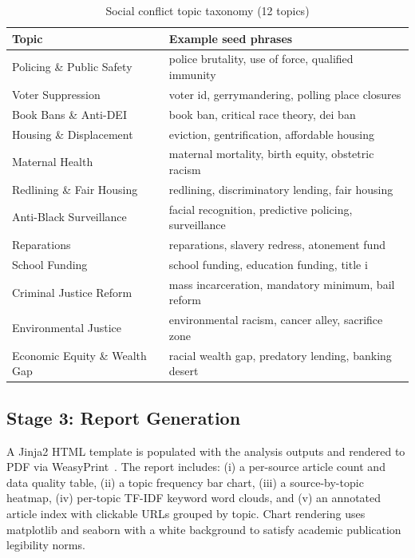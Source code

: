 \documentclass[sigconf,anonymous,review]{acmart}
\begin{document}
\begin{table}[h]
\caption{Social conflict topic taxonomy (12 topics)}
\label{tab:topics}
\small
\begin{tabular}{ll}
\toprule
\textbf{Topic} & \textbf{Example seed phrases} \\
\midrule
Policing \& Public Safety    & police brutality, use of force, qualified immunity \\
Voter Suppression            & voter id, gerrymandering, polling place closures \\
Book Bans \& Anti-DEI        & book ban, critical race theory, dei ban \\
Housing \& Displacement      & eviction, gentrification, affordable housing \\
Maternal Health              & maternal mortality, birth equity, obstetric racism \\
Redlining \& Fair Housing    & redlining, discriminatory lending, fair housing \\
Anti-Black Surveillance      & facial recognition, predictive policing, surveillance \\
Reparations                  & reparations, slavery redress, atonement fund \\
School Funding               & school funding, education funding, title i \\
Criminal Justice Reform      & mass incarceration, mandatory minimum, bail reform \\
Environmental Justice        & environmental racism, cancer alley, sacrifice zone \\
Economic Equity \& Wealth Gap & racial wealth gap, predatory lending, banking desert \\
\bottomrule
\end{tabular}
\end{table}

\subsection{Stage 3: Report Generation}

A Jinja2 HTML template is populated with the analysis outputs and rendered to
PDF via WeasyPrint~\cite{weasyprint}.
The report includes: (i) a per-source article count and data quality table,
(ii) a topic frequency bar chart, (iii) a source-by-topic heatmap,
(iv) per-topic TF-IDF keyword word clouds, and (v) an annotated article index
with clickable URLs grouped by topic.
Chart rendering uses matplotlib and seaborn with a white background to satisfy
academic publication legibility norms.
\end{document}
